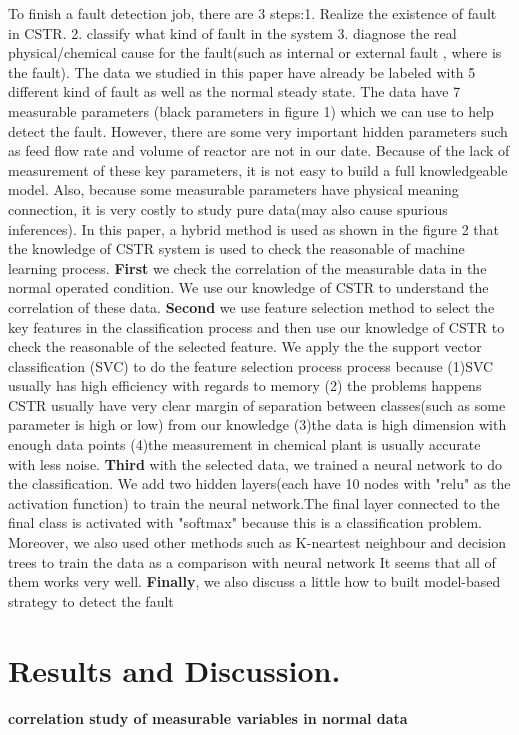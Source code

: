 \documentclass[fleqn,11pt]{wlscirep}
\begin{document}
To finish a fault detection job, there are 3 steps:1. Realize the existence of fault in CSTR. 2. classify what kind of fault in the system 3. diagnose the real physical/chemical cause for the fault(such as internal or external fault , where is the fault). The data we studied in this paper have already be labeled with 5 different kind of fault as well as the normal steady state. The data have 7 measurable parameters (black parameters in figure 1) which we can use to help detect the fault. However, there are some very important hidden parameters such as feed flow rate and volume of reactor  are not in our date. Because of the lack of measurement of these key parameters, it is not easy to build a full knowledgeable model. Also, because some measurable parameters have physical meaning connection, it is very costly to study pure data(may also cause spurious inferences). In this paper, a hybrid method is used as shown in the figure 2 that the knowledge of CSTR  system is used to check the reasonable of machine learning process. \textbf{First} we check the correlation of the measurable data in the normal operated condition. We use our knowledge of CSTR to understand the correlation of these data. \textbf{Second}  we use feature selection method to select the key features in the classification process and then use our knowledge of CSTR to check the reasonable of the selected feature. We apply the the support vector classification (SVC) to do the feature selection process process because (1)SVC usually has high efficiency with regards to memory (2) the problems happens CSTR usually have very clear margin of separation between classes(such as some parameter is high or low) from our knowledge (3)the data is high dimension with enough data points (4)the measurement in chemical plant is usually accurate with less noise. \textbf{Third} with the selected data, we trained a neural network to do the classification. We add two hidden layers(each have 10 nodes with "relu" as the activation function) to train the neural network.The final layer connected to the final class is activated with "softmax" because this is a classification problem. Moreover, we also used other methods such as K-neartest neighbour and  decision trees to train the data as  a comparison with neural network It seems that all of them works very well.
\textbf{Finally}, we also discuss a little how to built model-based strategy to detect the fault


\section{Results and Discussion.}
\textbf{correlation study of measurable variables in normal data}
\end{document}
